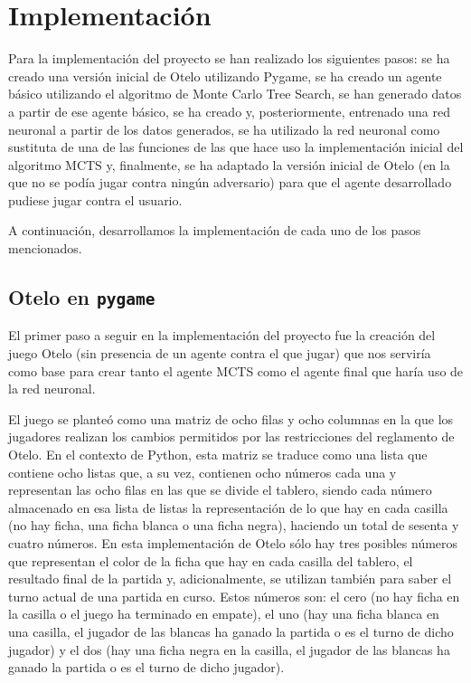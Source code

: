 \documentclass[conference]{IEEEtran}
\begin{document}
\section{Implementación}
Para la implementación del proyecto se han realizado los siguientes pasos: se ha creado una versión inicial de Otelo utilizando Pygame, se ha creado un agente básico utilizando el algoritmo de Monte Carlo Tree Search, se han generado datos a partir de ese agente básico, se ha creado y, posteriormente, entrenado una red neuronal a partir de los datos generados, se ha utilizado la red neuronal como sustituta de una de las funciones de las que hace uso la implementación inicial del algoritmo MCTS y, finalmente, se ha adaptado la versión inicial de Otelo (en la que no se podía jugar contra ningún adversario) para que el agente desarrollado pudiese jugar contra el usuario.

A continuación, desarrollamos la implementación de cada uno de los pasos mencionados.

\subsection{Otelo en \texttt{pygame}}
El primer paso a seguir en la implementación del proyecto fue la creación del juego Otelo (sin presencia de un agente contra el que jugar) que nos serviría como base para crear tanto el agente MCTS como el agente final que haría uso de la red neuronal.

El juego se planteó como una matriz de ocho filas y ocho columnas en la que los jugadores realizan los cambios permitidos por las restricciones del reglamento de Otelo. En el contexto de Python, esta matriz se traduce como una lista que contiene ocho listas que, a su vez, contienen ocho números cada una y representan las ocho filas en las que se divide el tablero, siendo cada número almacenado en esa lista de listas la representación de lo que hay en cada casilla (no hay ficha, una ficha blanca o una ficha negra), haciendo un total de sesenta y cuatro números. En esta implementación de Otelo sólo hay tres posibles números que representan el color de la ficha que hay en cada casilla del tablero, el resultado final de la partida y, adicionalmente, se utilizan también para saber el turno actual de una partida en curso. Estos números son: el cero (no hay ficha en la casilla o el juego ha terminado en empate), el uno (hay una ficha blanca en una casilla, el jugador de las blancas ha ganado la partida o es el turno de dicho jugador) y el dos (hay una ficha negra en la casilla, el jugador de las blancas ha ganado la partida o es el turno de dicho jugador).
\end{document}
